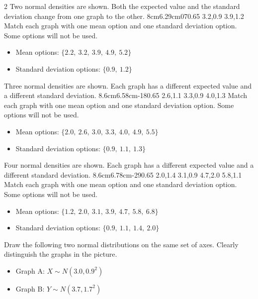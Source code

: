 \begin{multicols}{2}
		\vspace{-0.35cm}
		Two normal densities are shown. Both the expected value and the standard deviation change from one graph to the other.
		\vspace{-0.7cm}
		\NormalTwoGraph
		{8cm}{6.29cm}{0}{7}{0.65}
		{3.2,0.9}
		{3.9,1.2}
		Match each graph with one mean option and one standard deviation option. Some options will not be used.
		\begin{itemize}
			\item Mean options: $\{2.2,\ 3.2,\ 3.9,\ 4.9,\ 5.2\}$
			\item Standard deviation options: $\{0.9,\ 1.2\}$
		\end{itemize}
		
		\vspace{-0.35cm}
		Three normal densities are shown. Each graph has a different expected value and a different standard deviation.
		\NormalThreeGraph
		{8.6cm}{6.58cm}{-1}{8}{0.65}
		{2.6,1.1}
		{3.3,0.9}
		{4.0,1.3}
		Match each graph with one mean option and one standard deviation option. Some options will not be used.
		\begin{itemize}
			\item Mean options: $\{2.0,\ 2.6,\ 3.0,\ 3.3,\ 4.0,\ 4.9,\ 5.5\}$
			\item Standard deviation options: $\{0.9,\ 1.1,\ 1.3\}$
		\end{itemize}
		
		\vspace{-0.35cm}
		Four normal densities are shown. Each graph has a different expected value and a different standard deviation.
		\NormalFourGraph
		{8.6cm}{6.78cm}{-2}{9}{0.65}
		{2.0,1.4}
		{3.1,0.9}
		{4.7,2.0}
		{5.8,1.1}
		Match each graph with one mean option and one standard deviation option. Some options will not be used.
		\begin{itemize}
			\item Mean options: $\{1.2,\ 2.0,\ 3.1,\ 3.9,\ 4.7,\ 5.8,\ 6.8\}$
			\item Standard deviation options: $\{ 0.9,\ 1.1,\ 1.4,\ 2.0\}$
		\end{itemize}
		
		\vspace{-0.35cm}
		Draw the following two normal distributions on the same set of axes. Clearly distinguish the graphs in the picture.
		\begin{itemize}
			\item Graph A: $X\sim N(3.0,0.9^2)$
			\item Graph B: $Y\sim N(3.7,1.7^2)$
		\end{itemize}
		

\end{multicols}
